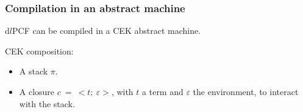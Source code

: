 \documentclass{beamer}
\begin{document}
\begin{frame}
  \frametitle{Compilation in an abstract machine}

  d$l$PCF can be compiled in a CEK abstract machine.

  \medskip

  CEK composition:
  \begin{itemize}
  \item A stack $\pi$.
  \item A closure $c~=~<t;~\varepsilon >$, with $t$ a term and $\varepsilon$ the
    environment, to interact with the stack.
  \end{itemize}

\end{frame}
\end{document}
